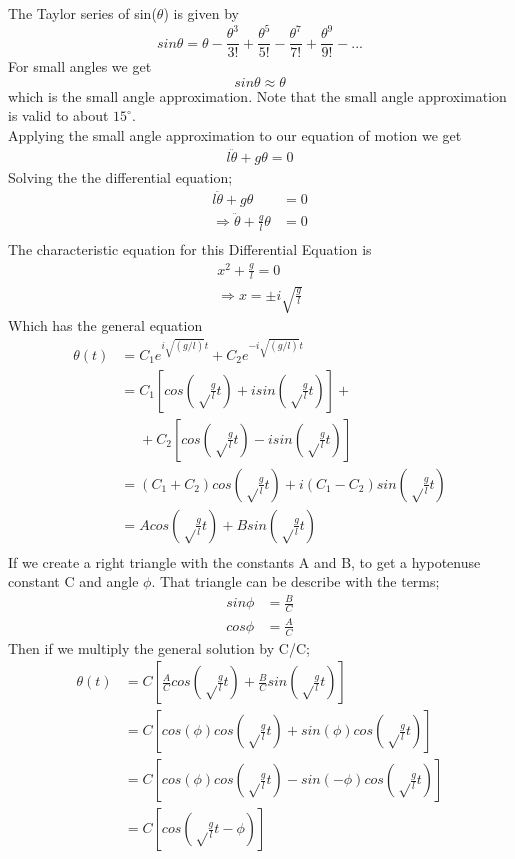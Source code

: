 \documentclass[iop]{emulateapj}
\begin{document}
The Taylor series of sin($\theta$) is given by
\begin{equation}
\boxed{sin\theta = \theta - \frac{\theta^3}{3!} + \frac{\theta^5}{5!} - \frac{\theta^7}{7!} + \frac{\theta^9}{9!} - ...}
\end{equation}
For small angles we get
\begin{equation}
\boxed{sin\theta \approx \theta}
\end{equation}
which is the small angle approximation. Note that the small angle approximation 
is valid to about $15^{\circ}$.\\
Applying the small angle approximation to our equation of motion we get
\begin{align}
\boxed{l\ddot{\theta} + g\theta = 0}
\end{align}
Solving the the differential equation;
\begin{align*}
l\ddot{\theta} + g\theta & = 0\\
\Rightarrow \ddot{\theta} + \frac{g}{l}\theta & = 0\\
\end{align*}
The characteristic equation for this Differential Equation is
\begin{align*}
x^2 + \frac{g}{l} = 0\\
\Rightarrow x = \pm i\sqrt{\frac{g}{l}}
\end{align*}
Which has the general equation
\begin{align*}
\theta(t) & = C_1e^{i\sqrt{(g/l)}t} + C_2e^{-i\sqrt{(g/l)}t}\\
& = C_1[cos(\sqrt\frac{g}{l}t) + isin(\sqrt\frac{g}{l}t)] +\\ 
&~~~~~~+ C_2[cos(\sqrt\frac{g}{l}t) - isin(\sqrt\frac{g}{l}t)]\\
& = (C_1 + C_2)cos(\sqrt\frac{g}{l}t) + i(C_1 - C_2)sin(\sqrt\frac{g}{l}t)\\
& = Acos(\sqrt\frac{g}{l}t) + Bsin(\sqrt\frac{g}{l}t)\\
\end{align*}
If we create a right triangle with the constants A and B, to get a hypotenuse
constant C and angle $\phi$. That triangle can be describe with the terms;
\begin{align*}
sin\phi & = \frac{B}{C}\\
cos\phi & = \frac{A}{C}
\end{align*}
Then if we multiply the general solution by C/C;
\begin{align*}
\theta(t) & = C[\frac{A}{C}cos(\sqrt\frac{g}{l}t) + \frac{B}{C}sin(\sqrt\frac{g}{l}t)]\\
& = C[cos(\phi) cos(\sqrt\frac{g}{l}t) + sin(\phi)cos(\sqrt\frac{g}{l}t)]\\
& = C[cos(\phi) cos(\sqrt\frac{g}{l}t) - sin(-\phi)cos(\sqrt\frac{g}{l}t)]\\
& = C[cos(\sqrt\frac{g}{l}t - \phi)]
\end{align*}
\end{document}
